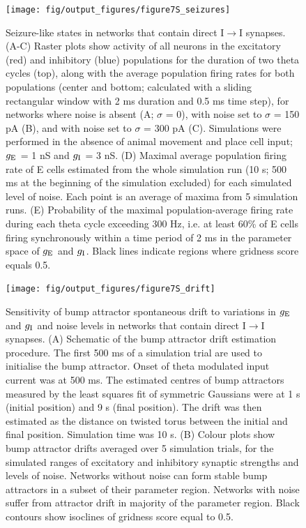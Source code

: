 \documentclass[a4paper,12pt]{article}
\newcommand{\ssc}[3]{\ensuremath{#1_{\text{#2}_{\text{#3}}}}}
\newcommand{\gE      }{\ssc{g}      {\scriptsize{E}}{}}
\newcommand{\gI      }{\ssc{g}      {\scriptsize{I}}{}}
\begin{document}
\clearpage

\begin{figure}[p]
    \internallinenumbers
    \centering
        \texttt{[image: fig/output\_figures/figure7S\_seizures]}
\end{figure}

\clearpage

\begin{figure}[H]
    \internallinenumbers
    \caption{Seizure-like states in networks that contain direct
    I$\rightarrow$I synapses. (A-C) Raster plots show activity of all neurons
    in the excitatory (red) and inhibitory (blue) populations for the duration
    of two theta cycles (top), along with the average population firing rates
    for both populations (center and bottom; calculated with a sliding
    rectangular window with 2 ms duration and 0.5 ms time step), for networks
    where noise is absent (A; $\sigma$ = 0), with noise set to $\sigma$ = 150
    pA (B), and with noise set to $\sigma$ = 300 pA (C). Simulations were
    performed in the absence of animal movement and place cell input; $\gE$ = 1 nS
    and $\gI$ = 3 nS.  (D) Maximal average population firing rate of E cells
    estimated from the whole simulation run (10 s; 500 ms at the beginning of
    the simulation excluded) for each simulated level of noise. Each point is
    an average of maxima from 5 simulation runs.  (E) Probability of the
    maximal population-average firing rate during each theta cycle exceeding
    300 Hz, i.e. at least 60\% of E cells firing synchronously within a time
    period of 2 ms in the parameter space of $\gE$ and $\gI$. Black lines indicate
    regions where gridness score equals 0.5.}
\end{figure}

\clearpage

\begin{figure}[ht!]
    \internallinenumbers
    \centering
        \texttt{[image: fig/output\_figures/figure7S\_drift]}
    \caption{Sensitivity of bump attractor spontaneous drift to variations in
    $\gE$ and $\gI$ and noise levels in networks that contain direct
    I$\rightarrow$I synapses. (A) Schematic of the bump attractor drift
    estimation procedure. The first 500 ms of a simulation trial are used to
    initialise the bump attractor. Onset of theta modulated input current was
    at 500 ms.  The estimated centres of bump attractors measured by the least
    squares fit of symmetric Gaussians were at 1 s (initial position) and 9 s
    (final position). The drift was then estimated as the distance on twisted
    torus between the initial and final position. Simulation time was 10 s. (B)
    Colour plots show bump attractor drifts averaged over 5 simulation trials,
    for the simulated ranges of excitatory and inhibitory synaptic strengths
    and levels of noise.  Networks without noise can form stable bump
    attractors in a subset of their parameter region. Networks with noise
    suffer from attractor drift in majority of the parameter region. Black
    contours show isoclines of gridness score equal to 0.5.}
\end{figure}
\end{document}
